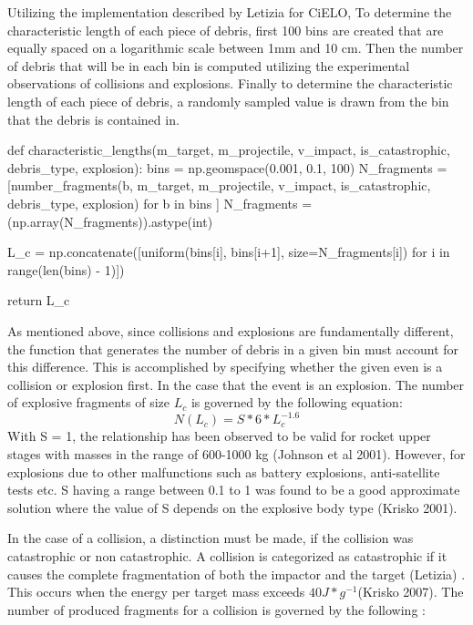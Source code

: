 \documentclass{article}
\newenvironment{code}{\captionsetup{type=listing}}{}
\begin{document}
Utilizing the implementation described by Letizia for CiELO, To determine the characteristic length of each piece of debris, first 100 bins are created that are equally spaced on a logarithmic scale between 1mm and 10 cm. Then the number of debris that will be in each bin is computed utilizing the experimental observations of collisions and explosions. Finally to determine the characteristic length of each piece of debris, a randomly sampled value is drawn from the bin that the debris is contained in. \cite{letizia_space_2016}
 
\newpage

 \begin{code}
 	\begin{tcbpythoncode}
 		def characteristic_lengths(m_target, m_projectile, v_impact, is_catastrophic, debris_type, explosion):
 		bins = np.geomspace(0.001, 0.1, 100)
 		N_fragments = [number_fragments(b, m_target, m_projectile, v_impact, is_catastrophic, debris_type, explosion) for b in bins ]
 		N_fragments = (np.array(N_fragments)).astype(int)
 		
 		L_c = np.concatenate([uniform(bins[i], bins[i+1], size=N_fragments[i]) for i in range(len(bins) - 1)])
 		
 		return L_c
 	\end{tcbpythoncode}
 \end{code}
 
 
 
As mentioned above, since collisions and explosions are fundamentally different, the function that generates the number of debris in a given bin must account for this difference. This is accomplished by specifying whether the given even is a collision or explosion first. In the case that the event is an explosion. The number of explosive fragments of size $L_c$ is governed by the following equation:
$$N(L_c) =S * 6 * L_c^{-1.6}$$
With S = 1, the relationship has been observed to be valid for rocket upper stages with masses in the range of 600-1000 kg (Johnson et al 2001). However, for explosions due to other malfunctions such as battery explosions, anti-satellite tests etc. S having a range between 0.1 to 1 was found to be a good approximate solution where the value of S depends on the explosive body type (Krisko 2001). 

In the case of a collision, a distinction must be made, if the collision was catastrophic or non catastrophic. A collision is categorized as catastrophic if it causes the complete fragmentation of both the impactor and the target (Letizia) \cite{letizia_space_2016}. This occurs when the energy per target mass exceeds $40 J * g^{-1}$(Krisko 2007). The number of produced fragments for a collision is governed by the following :
\end{document}
